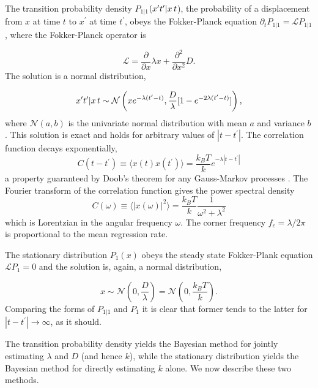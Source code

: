 \documentclass[english,aps, twocolumn, pre,superscriptaddress]{revtex4-1}
\begin{document}
The transition probability density $P_{1|1}$$(x^{\prime}t^{\prime}|x\thinspace t$),
the probability of a displacement from $x$ at time $t$ to $x^{\prime}$
at time $t^{\prime}$, obeys the Fokker-Planck equation $\partial_{t}P_{1|1}=\mathcal{L}P_{1|1}$,
where the Fokker-Planck operator is 

\begin{equation}
\mathcal{L}=\frac{\partial}{\partial x}\lambda x+\frac{\partial^{2}}{\partial x^{2}}D.
\end{equation}
The solution is a normal distribution, 

\begin{equation}
x^{\prime}t^{\prime}|x\thinspace t\sim\mathcal{N}\left(xe^{-\lambda(t^{\prime}-t)},\frac{D}{\lambda}[1-e^{-2\lambda(t^{\prime}-t)}]\right),
\end{equation}
where $\mathcal{N}(a,b)$ is the univariate normal distribution with
mean $a$ and variance $b$. This solution is exact and holds for
arbitrary values of $|t-t^{\prime}|$. The correlation function decays
exponentially, 
\begin{equation}
C(t-t^{\prime})\equiv\langle x(t)x(t^{\prime})\rangle=\frac{k_{B}T}{k}e^{-\lambda|t-t^{\prime}|}\label{eq:autocorr}
\end{equation}
a property guaranteed by Doob's theorem for any Gauss-Markov processes
\cite{van1992stochastic}. The Fourier transform of the correlation
function gives the power spectral density 
\begin{equation}
C(\omega)\equiv\langle|x(\omega)|^{2}\rangle=\frac{k_{B}T}{k}\frac{1}{\omega^{2}+\lambda^{2}}\label{eq:spectral-density}
\end{equation}
which is Lorentzian in the angular frequency $\omega$. The corner
frequency $f_{c}=\lambda/2\pi$ is proportional to the mean regression
rate. 

The stationary distribution $P_{1}(x)$ obeys the steady state Fokker-Plank
equation $\mathcal{L}P_{1}=0$ and the solution is, again, a normal
distribution,

\begin{equation}
x\sim\mathcal{N}\left(0,\frac{D}{\lambda}\right)=\mathcal{N}\left(0,\frac{k_{B}T}{k}\right).
\end{equation}
Comparing the forms of $P_{1|1}$ and $P_{1}$ it is clear that former
tends to the latter for $|t-t^{\prime}|\rightarrow\infty$, as it
should. 

The transition probability density yields the Bayesian method for
jointly estimating $\lambda$ and $D$ (and hence $k$), while the
stationary distribution yields the Bayesian method for directly estimating
$k$ alone. We now describe these two methods. 
\end{document}
